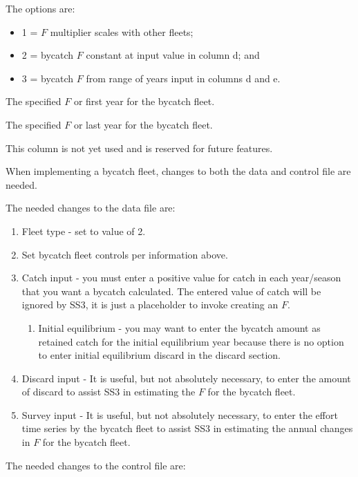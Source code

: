 The options are:  
\begin{itemize}
  	\item 1 = $F$ multiplier scales with other fleets;
  	\item 2 = bycatch $F$ constant at input value in column d; and
  	\item 3 = bycatch $F$ from range of years input in columns d and e.
\end{itemize}

The specified $F$ or first year for the bycatch fleet.

The specified $F$ or last year for the bycatch fleet.

This column is not yet used and is reserved for future features.

When implementing a bycatch fleet, changes to both the data and control file are needed.  

The needed changes to the data file are:

\begin{enumerate}
	\item Fleet type - set to value of 2.
	\item Set bycatch fleet controls per information above.
	\item Catch input - you must enter a positive value for catch in each year/season that you want a bycatch calculated. The entered value of catch will be ignored by SS3, it is just a placeholder to invoke creating an $F$.
	\begin{enumerate}
		\item Initial equilibrium - you may want to enter the bycatch amount as retained catch for the initial equilibrium year because there is no option to enter initial equilibrium discard in the discard section.
	\end{enumerate}	
	\item Discard input - It is useful, but not absolutely necessary, to enter the amount of discard to assist SS3 in estimating the $F$ for the bycatch fleet.
	\item Survey input - It is useful, but not absolutely necessary, to enter the effort time series by the bycatch fleet to assist SS3 in estimating the annual changes in $F$ for the bycatch fleet.
\end{enumerate}

The needed changes to the control file are:

